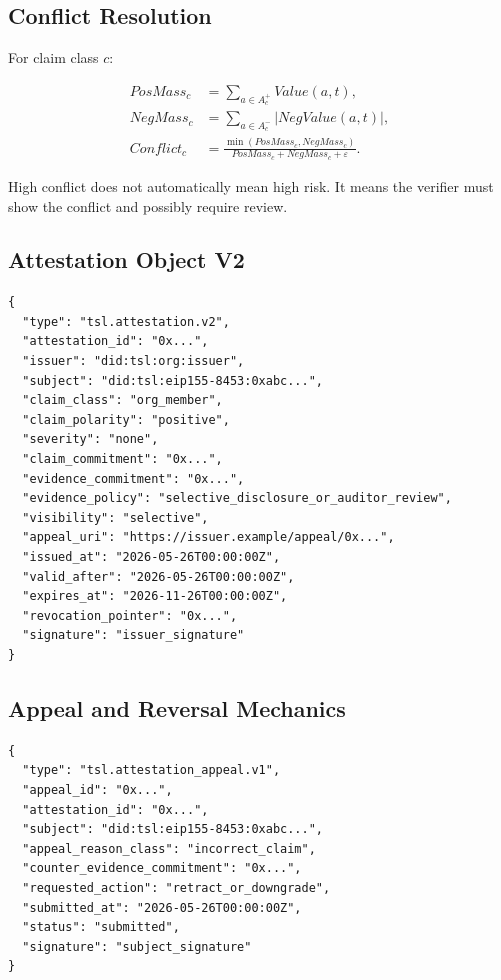\documentclass[11pt]{article}
\begin{document}
\subsection{Conflict Resolution}

For claim class \(c\):

\begin{align}
PosMass_c &= \sum_{a\in A^+_c}Value(a,t),\\
NegMass_c &= \sum_{a\in A^-_c}|NegValue(a,t)|,\\
Conflict_c &= \frac{\min(PosMass_c,NegMass_c)}{PosMass_c+NegMass_c+\varepsilon}.
\end{align}

High conflict does not automatically mean high risk. It means the verifier must show the conflict and possibly require review.

\subsection{Attestation Object V2}

\begin{lstlisting}[style=tslcode]
{
  "type": "tsl.attestation.v2",
  "attestation_id": "0x...",
  "issuer": "did:tsl:org:issuer",
  "subject": "did:tsl:eip155-8453:0xabc...",
  "claim_class": "org_member",
  "claim_polarity": "positive",
  "severity": "none",
  "claim_commitment": "0x...",
  "evidence_commitment": "0x...",
  "evidence_policy": "selective_disclosure_or_auditor_review",
  "visibility": "selective",
  "appeal_uri": "https://issuer.example/appeal/0x...",
  "issued_at": "2026-05-26T00:00:00Z",
  "valid_after": "2026-05-26T00:00:00Z",
  "expires_at": "2026-11-26T00:00:00Z",
  "revocation_pointer": "0x...",
  "signature": "issuer_signature"
}
\end{lstlisting}

\subsection{Appeal and Reversal Mechanics}

\begin{lstlisting}[style=tslcode]
{
  "type": "tsl.attestation_appeal.v1",
  "appeal_id": "0x...",
  "attestation_id": "0x...",
  "subject": "did:tsl:eip155-8453:0xabc...",
  "appeal_reason_class": "incorrect_claim",
  "counter_evidence_commitment": "0x...",
  "requested_action": "retract_or_downgrade",
  "submitted_at": "2026-05-26T00:00:00Z",
  "status": "submitted",
  "signature": "subject_signature"
}
\end{lstlisting}
\end{document}

